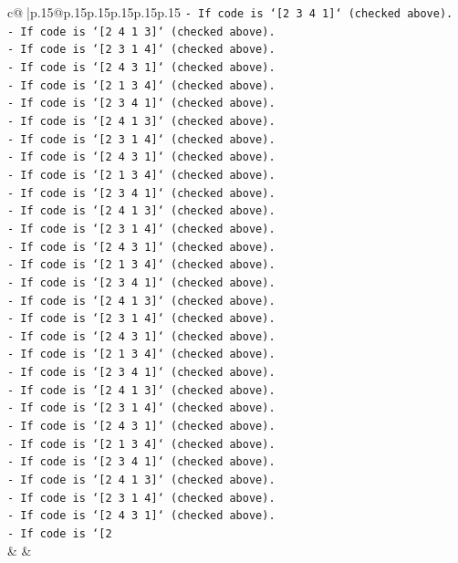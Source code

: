 \documentclass{article}
\begin{document}
{\begin{supertabular}{c@{$\;$}|p{.15\linewidth}@{}p{.15\linewidth}p{.15\linewidth}p{.15\linewidth}p{.15\linewidth}p{.15\linewidth}}
{{{\texttt{{-} If code is `{[}2 3 4 1{]}` (checked above).} \\
\texttt{{-} If code is `{[}2 4 1 3{]}` (checked above).} \\
\texttt{{-} If code is `{[}2 3 1 4{]}` (checked above).} \\
\texttt{{-} If code is `{[}2 4 3 1{]}` (checked above).} \\
\texttt{{-} If code is `{[}2 1 3 4{]}` (checked above).} \\
\texttt{{-} If code is `{[}2 3 4 1{]}` (checked above).} \\
\texttt{{-} If code is `{[}2 4 1 3{]}` (checked above).} \\
\texttt{{-} If code is `{[}2 3 1 4{]}` (checked above).} \\
\texttt{{-} If code is `{[}2 4 3 1{]}` (checked above).} \\
\texttt{{-} If code is `{[}2 1 3 4{]}` (checked above).} \\
\texttt{{-} If code is `{[}2 3 4 1{]}` (checked above).} \\
\texttt{{-} If code is `{[}2 4 1 3{]}` (checked above).} \\
\texttt{{-} If code is `{[}2 3 1 4{]}` (checked above).} \\
\texttt{{-} If code is `{[}2 4 3 1{]}` (checked above).} \\
\texttt{{-} If code is `{[}2 1 3 4{]}` (checked above).} \\
\texttt{{-} If code is `{[}2 3 4 1{]}` (checked above).} \\
\texttt{{-} If code is `{[}2 4 1 3{]}` (checked above).} \\
\texttt{{-} If code is `{[}2 3 1 4{]}` (checked above).} \\
\texttt{{-} If code is `{[}2 4 3 1{]}` (checked above).} \\
\texttt{{-} If code is `{[}2 1 3 4{]}` (checked above).} \\
\texttt{{-} If code is `{[}2 3 4 1{]}` (checked above).} \\
\texttt{{-} If code is `{[}2 4 1 3{]}` (checked above).} \\
\texttt{{-} If code is `{[}2 3 1 4{]}` (checked above).} \\
\texttt{{-} If code is `{[}2 4 3 1{]}` (checked above).} \\
\texttt{{-} If code is `{[}2 1 3 4{]}` (checked above).} \\
\texttt{{-} If code is `{[}2 3 4 1{]}` (checked above).} \\
\texttt{{-} If code is `{[}2 4 1 3{]}` (checked above).} \\
\texttt{{-} If code is `{[}2 3 1 4{]}` (checked above).} \\
\texttt{{-} If code is `{[}2 4 3 1{]}` (checked above).} \\
\texttt{{-} If code is `{[}2} \\
            }
        }
    }
    & & \\ \\


\end{supertabular}}
\end{document}
